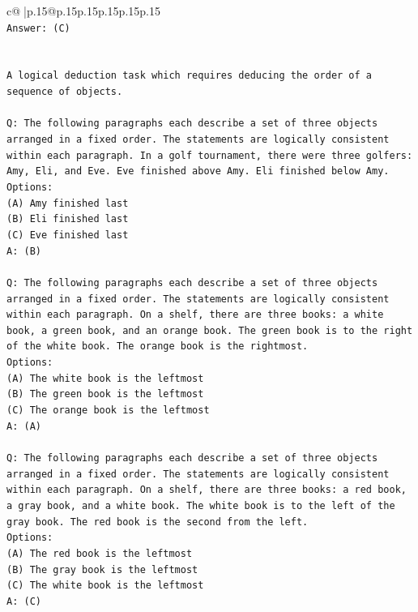 \documentclass{article}
\begin{document}
{\begin{supertabular}{c@{$\;$}|p{.15\linewidth}@{}p{.15\linewidth}p{.15\linewidth}p{.15\linewidth}p{.15\linewidth}p{.15\linewidth}}
{{{\\ 
\texttt{Answer: (C)} \\
\\ 
\\ 
\texttt{A logical deduction task which requires deducing the order of a sequence of objects.} \\
\\ 
\texttt{Q: The following paragraphs each describe a set of three objects arranged in a fixed order. The statements are logically consistent within each paragraph. In a golf tournament, there were three golfers: Amy, Eli, and Eve. Eve finished above Amy. Eli finished below Amy.} \\
\texttt{Options:} \\
\texttt{(A) Amy finished last} \\
\texttt{(B) Eli finished last} \\
\texttt{(C) Eve finished last} \\
\texttt{A: (B)} \\
\\ 
\texttt{Q: The following paragraphs each describe a set of three objects arranged in a fixed order. The statements are logically consistent within each paragraph. On a shelf, there are three books: a white book, a green book, and an orange book. The green book is to the right of the white book. The orange book is the rightmost.} \\
\texttt{Options:} \\
\texttt{(A) The white book is the leftmost} \\
\texttt{(B) The green book is the leftmost} \\
\texttt{(C) The orange book is the leftmost} \\
\texttt{A: (A)} \\
\\ 
\texttt{Q: The following paragraphs each describe a set of three objects arranged in a fixed order. The statements are logically consistent within each paragraph. On a shelf, there are three books: a red book, a gray book, and a white book. The white book is to the left of the gray book. The red book is the second from the left.} \\
\texttt{Options:} \\
\texttt{(A) The red book is the leftmost} \\
\texttt{(B) The gray book is the leftmost} \\
\texttt{(C) The white book is the leftmost} \\
\texttt{A: (C)} \\
}}}
\end{supertabular}}
\end{document}
